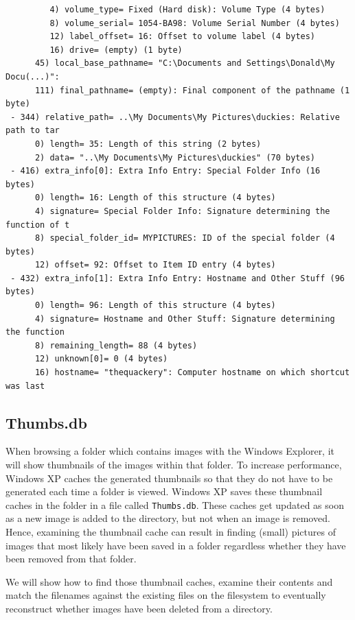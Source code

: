 \documentclass[a4paper,
    11pt,
    normalheadings,
    parindent,
    UKenglish,
    abstracton,
    ]{scrartcl}
\renewcommand{\comment}[1]{}
\begin{document}
\begin{verbatim}
         4) volume_type= Fixed (Hard disk): Volume Type (4 bytes)
         8) volume_serial= 1054-BA98: Volume Serial Number (4 bytes)
         12) label_offset= 16: Offset to volume label (4 bytes)
         16) drive= (empty) (1 byte)
      45) local_base_pathname= "C:\Documents and Settings\Donald\My Docu(...)":
      111) final_pathname= (empty): Final component of the pathname (1 byte)
 - 344) relative_path= ..\My Documents\My Pictures\duckies: Relative path to tar
      0) length= 35: Length of this string (2 bytes)
      2) data= "..\My Documents\My Pictures\duckies" (70 bytes)
 - 416) extra_info[0]: Extra Info Entry: Special Folder Info (16 bytes)
      0) length= 16: Length of this structure (4 bytes)
      4) signature= Special Folder Info: Signature determining the function of t
      8) special_folder_id= MYPICTURES: ID of the special folder (4 bytes)
      12) offset= 92: Offset to Item ID entry (4 bytes)
 - 432) extra_info[1]: Extra Info Entry: Hostname and Other Stuff (96 bytes)
      0) length= 96: Length of this structure (4 bytes)
      4) signature= Hostname and Other Stuff: Signature determining the function
      8) remaining_length= 88 (4 bytes)
      12) unknown[0]= 0 (4 bytes)
      16) hostname= "thequackery": Computer hostname on which shortcut was last
\end{verbatim}
\fi




\subsection{Thumbs.db}
When browsing a folder which contains images with the Windows Explorer, it will show thumbnails of the images within that folder.
To increase performance, Windows XP caches the generated thumbnails so that they do not have to be generated each time a folder is viewed.
Windows XP saves these thumbnail caches in the folder in a file called \texttt{Thumbs.db}.
These caches get updated as soon as a new image is added to the directory, but not when an image is removed.
Hence, examining the thumbnail cache can result in finding (small) pictures of images that most likely have been saved in a folder regardless whether they have been removed from that folder.
\comment{We will show how we do what?!}

We will show how to find those thumbnail caches, examine their contents and match the filenames against the existing files on the filesystem to eventually reconstruct whether images have been deleted from a directory.
\end{document}
